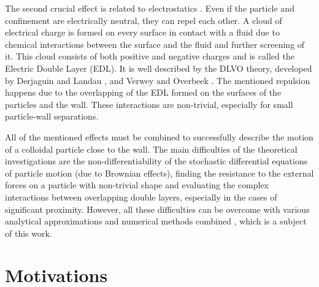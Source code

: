 \documentclass{master_thesis}
\begin{document}
The second crucial effect is related to electrostatics \cite{andelman_2006,israelachvili_2011,liang_2007,gouy_1910,derjaguin_landau_1941,verwey_overbeek_1948}. Even if the particle and confinement are electrically neutral, they can repel each other. A cloud of electrical charge is formed on every surface in contact with a fluid due to chemical interactions between the surface and the fluid and further screening of it. This cloud consists of both positive and negative charges and is called the Electric Double Layer (EDL). It is well described by the DLVO theory, developed by Derjaguin and Landau \cite{derjaguin_landau_1941}, and Verwey and Overbeek \cite{verwey_overbeek_1948}. The mentioned repulsion happens due to the overlapping of the EDL formed on the surfaces of the particles and the wall. These interactions are non-trivial, especially for small particle-wall separations.

All of the mentioned effects must be combined to successfully describe the motion of a colloidal particle close to the wall. The main difficulties of the theoretical investigations are the non-differentiability of the stochastic differential equations of particle motion (due to Brownian effects), finding the resistance to the external forces on a particle with non-trivial shape and evaluating the complex interactions between overlapping double layers, especially in the cases of significant proximity. However, all these difficulties can be overcome with various analytical approximations and numerical methods combined \cite{ohshima1998,cichocki2000,lisicki2016,waszkiewicz2023}, which is a subject of this work.

\section{Motivations}
\end{document}
